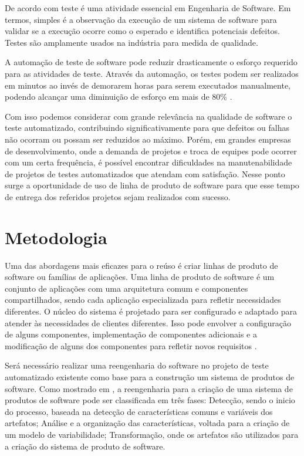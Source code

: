 \documentclass[12pt,a4paper]{article}
\begin{document}
De acordo com \cite{bertolino2007} teste é uma atividade essencial em Engenharia de Software. Em termos, simples é a observação da execução de um sistema de software para validar se a execução ocorre como o esperado e identifica potenciais defeitos. Testes são amplamente usados na indústria para medida de qualidade.

A automação de teste de software pode reduzir drasticamente o esforço requerido para as atividades de teste. Através da automação, os testes podem ser realizados em minutos ao invés de demorarem horas para serem executados manualmente, podendo alcançar uma diminuição de esforço em mais de 80\%  \cite{fewster1999}.

Com isso podemos considerar com grande relevância na qualidade de software o teste automatizado, contribuindo significativamente para que defeitos ou falhas não ocorram ou possam ser reduzidos ao máximo. Porém, em grandes empresas de desenvolvimento, onde a demanda de projetos e troca de equipes pode ocorrer com um certa frequência, é possível encontrar dificuldades na manutenabilidade de projetos de testes automatizados que atendam com satisfação. Nesse ponto surge a oportunidade de uso de linha de produto de software para que esse tempo de entrega dos referidos projetos sejam realizados com sucesso. 
\section{Metodologia}
Uma das abordagens mais eficazes para o reúso é criar linhas de produto de software ou famílias de aplicações. Uma linha de produto de software é um conjunto de aplicações com uma arquitetura comum e componentes compartilhados, sendo cada aplicação especializada para refletir necessidades diferentes. O núcleo do sistema é projetado para ser configurado e adaptado para atender às necessidades de clientes diferentes. Isso pode envolver a configuração de alguns componentes, implementação de componentes adicionais e a modificação de alguns dos componentes para refletir novos requisitos \cite{Sommerville2011}.

Será necessário realizar uma reengenharia do software no projeto de teste automatizado existente como base para a construção um sistema de produtos de software. Como mostrado em \cite{assunccao2017}, a reengenharia para a criação de uma sistema de produtos de software pode ser classificada em três fases: Detecção, sendo o inicio do processo, baseada na detecção de características comuns e variáveis dos artefatos; Análise e a organização das características, voltada para a criação de um modelo de variabilidade; Transformação, onde os artefatos são utilizados para a criação do sistema de produto de software.
\end{document}
